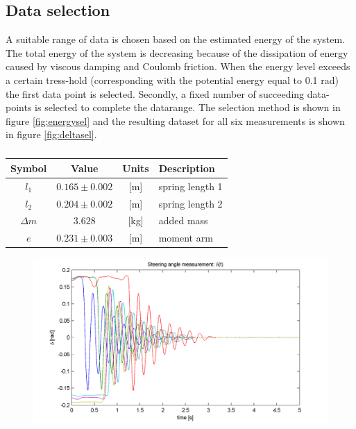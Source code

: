 \subsection{Data selection}
A suitable range of data is chosen based on the estimated energy of the system. The total energy of the system is decreasing because of the dissipation of energy caused by viscous damping and Coulomb friction. When the energy level exceeds a certain tress-hold (corresponding with the potential energy equal to 0.1 rad) the first data point is selected. Secondly, a fixed number of succeeding data-points is selected to complete the datarange. The selection method is shown in figure \ref{fig:energysel} and the resulting dataset for all six measurements is shown in figure \ref{fig:deltasel}. 
		\begin{table}
				\centering
				\begin{tabular}{cccl}
				\toprule
				Symbol & Value & Units & Description \\
				\midrule
				$l_1$ 	& $0.165\pm0.002$ & [m] & spring length 1 \\
				$l_2$ 	& $0.204\pm0.002$ & [m] & spring length 2 \\
				$\Delta m$ 	& $3.628$ & [kg] & added mass \\
				$e$ 		& $0.231\pm0.003$  & [m]	& moment arm \\
				\bottomrule
				\end{tabular}
				\caption{}
				\label{table:measureparms}
		\end{table}		
		\begin{figure}
			\centering
				\includegraphics{images/example}
				\caption{}
				\label{fig:example}
		\end{figure}
